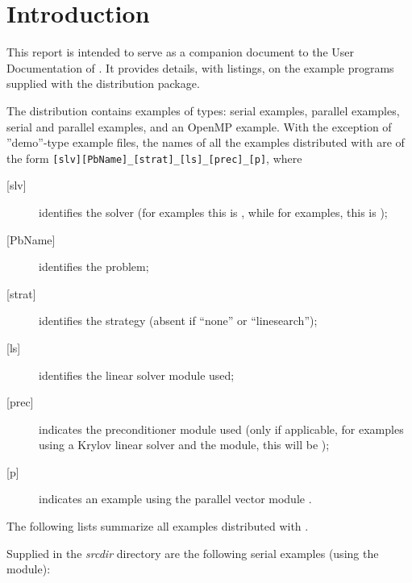 \section{Introduction}\label{s:ex_intro}

This report is intended to serve as a companion document to the User
Documentation of {\kinsol} \cite{kinsol_ug}.  It provides details, with
listings, on the example programs supplied with the {\kinsol} distribution
package.

The {\kinsol} distribution contains examples of types: serial
{\CC} examples, parallel {\CC} examples, serial and parallel {\F}
examples, and an OpenMP example.
With the exception of ''demo''-type example files, the names of all the examples 
distributed with {\sundials} are of the form
\verb![slv][PbName]_[strat]_[ls]_[prec]_[p]!, where
\begin{description}
\item [{[slv]}] identifies the solver (for {\kinsol} examples this is , 
  while for {\fkinsol} examples, this is );
\item [{[PbName]}] identifies the problem;
\item [{[strat]}] identifies the strategy (absent if ``none'' or ``linesearch'');
\item [{[ls]}] identifies the linear solver module used;
\item [{[prec]}] indicates the {\kinsol} preconditioner module used
  (only if applicable, for examples using a Krylov linear solver
  and the {\kinbbdpre} module, this will be );
\item [{[p]}] indicates an example using the parallel vector module {\nvecp}.
\end{description}

\vspace{0.2in}\noindent
The following lists summarize all examples distributed with {\kinsol}.

\vspace{0.2in}\noindent
Supplied in the {\em srcdir} directory are the
following serial examples (using the {\nvecs} module):

